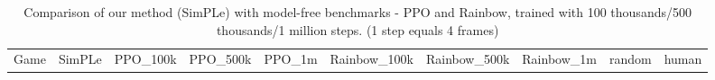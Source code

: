 \begin{landscape}
\begin{changemargin}{0cm}{0cm}
\begin{center}
\vspace*{\fill}
\setlength{\tabcolsep}{5pt}

\begin{table}[!htbp]
\scriptsize
\caption{Comparison of our method (SimPLe) with model-free benchmarks - PPO and Rainbow, trained with 100 thousands/500 thousands/1 million steps. (1 step equals 4 frames)}
\begin{tabular}{lrlrlrlrlrlrlrlcc}

Game &          \multicolumn{2}{c}{SimPLe}  &     \multicolumn{2}{c}{PPO\_100k}   &     \multicolumn{2}{c}{PPO\_500k} &     \multicolumn{2}{c}{PPO\_1m}   &     \multicolumn{2}{c}{Rainbow\_100k} &          \multicolumn{2}{c}{Rainbow\_500k}	&     \multicolumn{2}{c}{Rainbow\_1m} &		random &		human\\



\end{tabular}
\end{table}
\end{center}
\end{changemargin}
\end{landscape}
